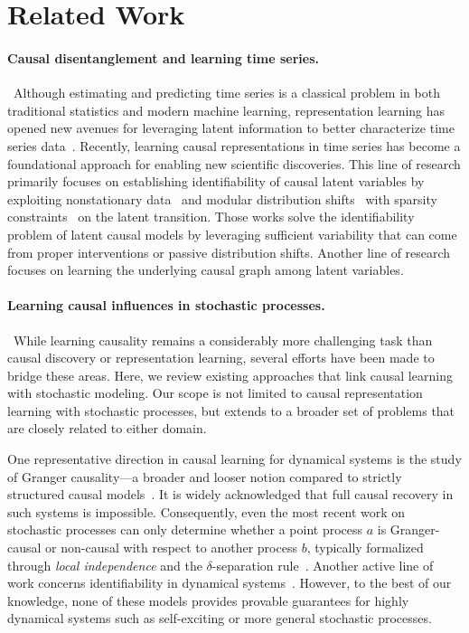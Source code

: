 \documentclass[10pt]{article}
\numberwithin{figure}{section}
\begin{document}
\section{Related Work}\label{extended_relatedwork}

\paragraph{Causal disentanglement and learning time series.}~Although estimating and predicting time series is a classical problem in both traditional statistics and modern machine learning, representation learning has opened new avenues for leveraging latent information to better characterize time series data~\citep{wu_autoformer_2021,liu_itransformer_2024}. Recently, learning causal representations in time series has become a foundational approach for enabling new scientific discoveries. This line of research primarily focuses on establishing identifiability of causal latent variables by exploiting nonstationary data~\citep{yao_learning_2022,yao_temporally_2022} and modular distribution shifts~\citep{song_temporally_2023,cai_orthogonality_2024} with sparsity constraints~\citep{NEURIPS2024_8cef4e4b,zhang_causal_2024} on the latent transition. Those works solve the identifiability problem of latent causal models by leveraging sufficient variability that can come from proper interventions or passive distribution shifts. Another line of research focuses on learning the underlying causal graph among latent variables. 
\vspace{-8pt}
\paragraph{Learning causal influences in stochastic processes.}~While learning causality remains a considerably more challenging task than causal discovery or representation learning, several efforts have been made to bridge these areas. Here, we review existing approaches that link causal learning with stochastic modeling. Our scope is not limited to causal representation learning with stochastic processes, but extends to a broader set of problems that are closely related to either domain. 

One representative direction in causal learning for dynamical systems is the study of Granger causality—a broader and looser notion compared to strictly structured causal models~\citep{achab_uncovering_2018}. It is widely acknowledged that full causal recovery in such systems is impossible. Consequently, even the most recent work on stochastic processes can only determine whether a point process $a$ is Granger-causal or non-causal with respect to another process $b$, typically formalized through \textit{local independence} and the $\delta$-separation rule~\citep{didelez_graphical_2008}. Another active line of work concerns identifiability in dynamical systems~\citep{lippeCausalRepresentationLearning2023}. However, to the best of our knowledge, none of these models provides provable guarantees for highly dynamical systems such as self-exciting or more general stochastic processes. 
\end{document}

